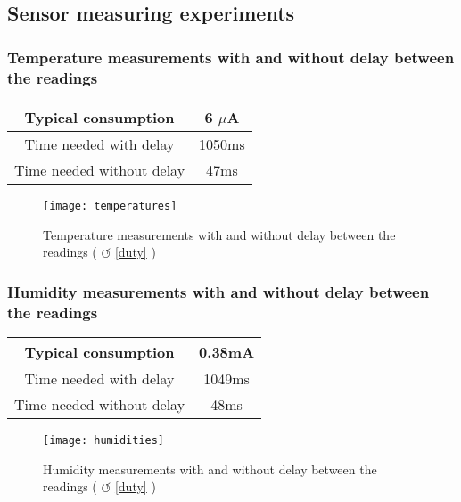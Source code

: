 \subsection{Sensor measuring experiments}
\label{sensMeasuring}
\subsubsection{Temperature measurements with and without delay between the readings}
\begin{table}[!hb]
\begin{center}
\begin{tabular}[!hb]{|c|c|}
\hline
Typical consumption  & 6 $\mu$A\\
\hline
Time needed with delay & 1050ms\\
\hline
Time needed without delay & 47ms\\
\hline
\end{tabular}
\label{tab:sleep1}
\end{center}
\end{table}
\begin{figure}[htbp]
\centering
\texttt{[image: temperatures]}
\caption{Temperature measurements with and without delay between the readings ( $\circlearrowleft$ \ref{duty} )}
\label{fig:temperatures}
\end{figure} 
\vfill
\pagebreak
\subsubsection{Humidity measurements with and without delay between the readings}
\begin{table}[!hb]
\begin{center}
\begin{tabular}[!hb]{|c|c|}
\hline
Typical consumption  & 0.38mA\\
\hline
Time needed with delay & 1049ms\\
\hline
Time needed without delay & 48ms\\
\hline
\end{tabular}
\label{tab:sleep1}
\end{center}
\end{table}
\begin{figure}[htbp]
\centering
\texttt{[image: humidities]}
\caption{Humidity measurements with and without delay between the readings ( $\circlearrowleft$ \ref{duty} )}
\label{fig:humidities}
\end{figure} 
\vfill
\pagebreak
